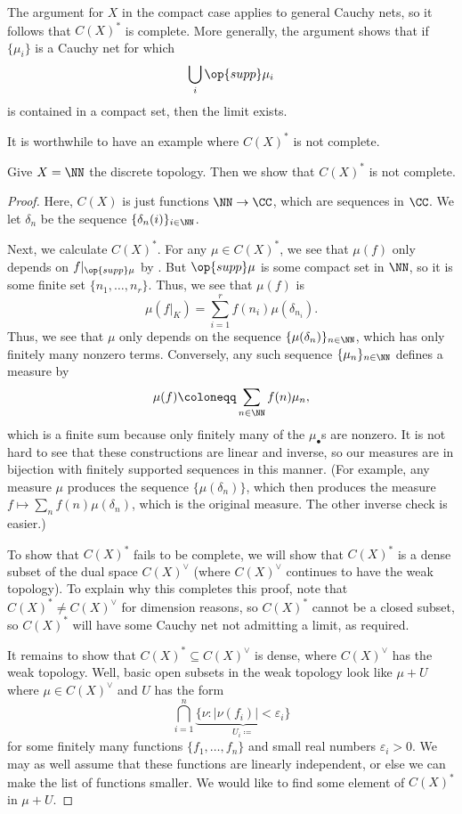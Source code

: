\documentclass[../notes.tex]{subfiles}
\begin{document}
\begin{remark} \label{rem:weird-cauchy-net-limit}
	The argument for $X$ in the compact case applies to general Cauchy nets, so it follows that $C(X)^*$ is complete. More generally, the argument shows that if $\{\mu_i\}$ is a Cauchy net for which
	\[\bigcup_i\op{supp}\mu_i\]
	is contained in a compact set, then the limit exists.
\end{remark}
It is worthwhile to have an example where $C(X)^*$ is not complete. 
\begin{example} \label{ex:c-x-not-complete}
	Give $X=\NN$ the discrete topology. Then we show that $C(X)^*$ is not complete.
\end{example}
\begin{proof}
	Here, $C(X)$ is just functions $\NN\to\CC$, which are sequences in $\CC$. We let $\delta_n$ be the sequence $\{\delta_n(i)\}_{i\in\NN}$.
	
	Next, we calculate $C(X)^*$. For any $\mu\in C(X)^*$, we see that $\mu(f)$ only depends on $f|_{\op{supp}\mu}$ by . But $\op{supp}\mu$ is some compact set in $\NN$, so it is some finite set $\{n_1,\ldots,n_r\}$. Thus, we see that $\mu(f)$ is
	\[\mu(f|_K)=\sum_{i=1}^rf(n_i)\mu(\delta_{n_i}).\]
	Thus, we see that $\mu$ only depends on the sequence $\{\mu(\delta_n)\}_{n\in\NN}$, which has only finitely many nonzero terms. Conversely, any such sequence $\{\mu_n\}_{n\in\NN}$ defines a measure by
	\[\mu(f)\coloneqq\sum_{n\in\NN}f(n)\mu_n,\]
	which is a finite sum because only finitely many of the $\mu_\bullet$s are nonzero. It is not hard to see that these constructions are linear and inverse, so our measures are in bijection with finitely supported sequences in this manner. (For example, any measure $\mu$ produces the sequence $\{\mu(\delta_n)\}$, which then produces the measure $f\mapsto\sum_nf(n)\mu(\delta_n)$, which is the original measure. The other inverse check is easier.)

	To show that $C(X)^*$ fails to be complete, we will show that $C(X)^*$ is a dense subset of the dual space $C(X)^\lor$ (where $C(X)^\lor$ continues to have the weak topology). To explain why this completes this proof, note that $C(X)^*\ne C(X)^\lor$ for dimension reasons, so $C(X)^*$ cannot be a closed subset, so $C(X)^*$ will have some Cauchy net not admitting a limit, as required.

	It remains to show that $C(X)^*\subseteq C(X)^\lor$ is dense, where $C(X)^\lor$ has the weak topology. Well, basic open subsets in the weak topology look like $\mu+U$ where $\mu\in C(X)^\lor$ and $U$ has the form
	\[\bigcap_{i=1}^n\underbrace{\{\nu:\left|\nu(f_i)\right|<\varepsilon_i\}}_{U_i\coloneqq}\]
	for some finitely many functions $\{f_1,\ldots,f_n\}$ and small real numbers $\varepsilon_i>0$. We may as well assume that these functions are linearly independent, or else we can make the list of functions smaller. We would like to find some element of $C(X)^*$ in $\mu+U$.
	

\end{proof}
\end{document}
